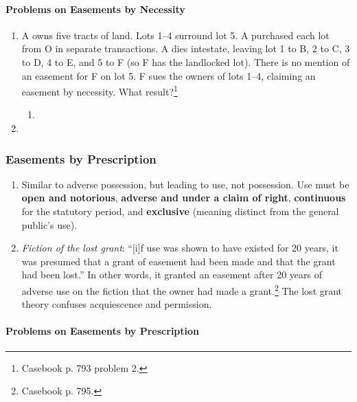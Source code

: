 \paragraph{Problems on Easements by Necessity}

\begin{enumerate}
    \item A owns five tracts of land. Lots 1--4 surround lot 5. A purchased 
    each lot from O in separate transactions. A dies intestate, leaving lot 1 
    to B, 2 to C, 3 to D, 4 to E, and 5 to F (so F has the landlocked lot). 
    There is no mention of an easement for F on lot 5. F sues the owners of 
    lots 1--4, claiming an easement by necessity. What 
    result?\footnote{Casebook p. 793 problem 2.}
    \begin{enumerate}
        \item %
    \end{enumerate}
    \item %
\end{enumerate}

\subsubsection{Easements by Prescription}

\begin{enumerate}
    \item Similar to adverse possession, but leading to use, not possession. 
    Use must be \textbf{open and notorious}, \textbf{adverse and under a claim 
    of right}, \textbf{continuous} for the statutory period, and 
    \textbf{exclusive} (meaning distinct from the general public's use).
    \item \emph{Fiction of the lost grant}: ``[i]f use was shown to have 
    existed for 20 years, it was presumed that a grant of easement had been 
    made and that the grant had been lost.'' In other words, it granted an 
    easement after 20 years of adverse use on the fiction that the owner had 
    made a grant.\footnote{Casebook p. 795.} The lost grant theory confuses 
    acquiescence and permission.
\end{enumerate}

\paragraph{Problems on Easements by Prescription}

